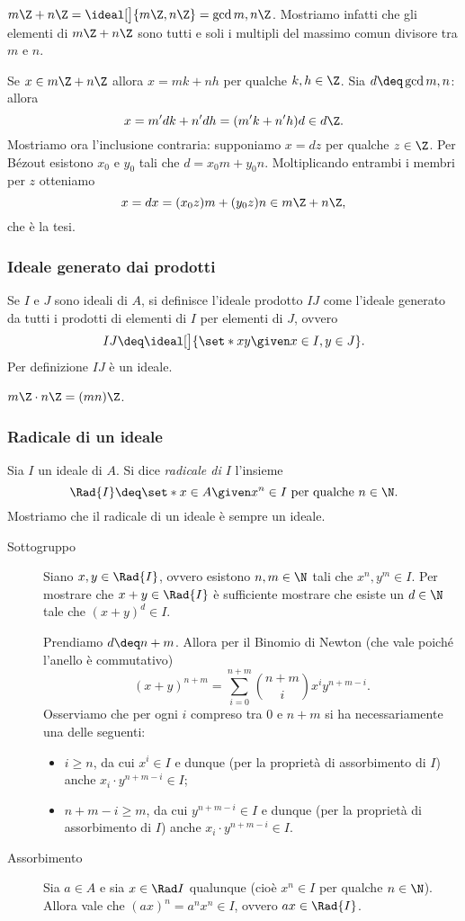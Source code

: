 \begin{example}
    $m\Z + n\Z = \ideal[\big]{m\Z, n\Z} = \gcd{m, n}\Z$. Mostriamo infatti che gli elementi di $m\Z + n\Z$ sono tutti e soli i multipli del massimo comun divisore tra $m$ e $n$.

    Se $x \in m\Z + n\Z$ allora $x = mk + nh$ per qualche $k, h \in \Z$. Sia $d \deq \gcd{m, n}$: allora \[
        x = m'dk + n'dh = (m'k + n'h)d \in d\Z.    
    \] Mostriamo ora l'inclusione contraria: supponiamo $x = dz$ per qualche $z \in \Z$. Per Bézout esistono $x_0$ e $y_0$ tali che $d = x_0m + y_0n$. Moltiplicando entrambi i membri per $z$ otteniamo \[
        x = dx = (x_0z)m + (y_0z)n \in m\Z + n\Z,    
    \] che è la tesi.
\end{example}

\subsubsection{Ideale generato dai prodotti}

Se $I$ e $J$ sono ideali di $A$, si definisce l'ideale prodotto $IJ$ come l'ideale generato da tutti i prodotti di elementi di $I$ per elementi di $J$, ovvero \[
    IJ \deq \ideal[\big]{\set*{xy \given x \in I, y \in J}}.
\] Per definizione $IJ$ è un ideale.

\begin{example}
    $m\Z \cdot n\Z = (mn)\Z$.
\end{example}

\subsubsection{Radicale di un ideale}
Sia $I$ un ideale di $A$. Si dice \emph{radicale di $I$} l'insieme \[
    \Rad{I} \deq \set*{x \in A \given x^n \in I \text{ per qualche } n \in \N}.    
\] Mostriamo che il radicale di un ideale è sempre un ideale.
\begin{description}
    \item[Sottogruppo] Siano $x, y \in \Rad{I}$, ovvero esistono $n, m \in \N$ tali che $x^n, y^m \in I$. Per mostrare che $x + y \in \Rad{I}$ è sufficiente mostrare che esiste un $d \in \N$ tale che $(x + y)^d \in I$.
    
    Prendiamo $d \deq n + m$. Allora per il Binomio di Newton (che vale poiché l'anello è commutativo) \[
        (x + y)^{n + m} = \sum_{i = 0}^{n+m} \binom{n + m}{i} x^iy^{n+m-i}.    
    \] Osserviamo che per ogni $i$ compreso tra $0$ e $n+m$ si ha necessariamente una delle seguenti: \begin{itemize}
        \item $i \geq n$, da cui $x^i \in I$ e dunque (per la proprietà di assorbimento di $I$) anche $x_i \cdot y^{n+m-i} \in I$;
        \item $n + m - i \geq m$, da cui $y^{n + m - i} \in I$ e dunque (per la proprietà di assorbimento di $I$) anche $x_i \cdot y^{n+m-i} \in I$.
    \end{itemize}
    \item[Assorbimento] Sia $a \in A$ e sia $x \in \Rad I$ qualunque (cioè $x^n \in I$ per qualche $n \in \N$). Allora vale che $(ax)^n = a^nx^n \in I$, ovvero $ax \in \Rad{I}$.
\end{description}

